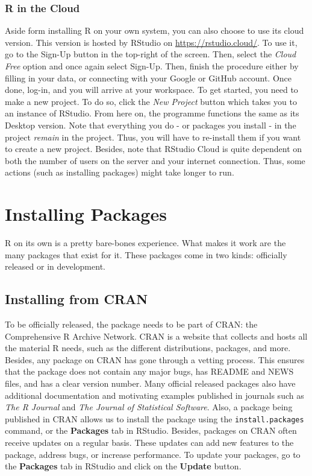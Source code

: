 \documentclass[
]{book}
\begin{document}
\hypertarget{r-in-the-cloud}{%
\subsection{R in the Cloud}\label{r-in-the-cloud}}

Aside form installing R on your own system, you can also choose to use its cloud version. This version is hosted by RStudio on \url{https://rstudio.cloud/}. To use it, go to the Sign-Up button in the top-right of the screen. Then, select the \emph{Cloud Free} option and once again select Sign-Up. Then, finish the procedure either by filling in your data, or connecting with your Google or GitHub account. Once done, log-in, and you will arrive at your workspace. To get started, you need to make a new project. To do so, click the \emph{New Project} button which takes you to an instance of RStudio. From here on, the programme functions the same as its Desktop version. Note that everything you do - or packages you install - in the project \emph{remain} in the project. Thus, you will have to re-install them if you want to create a new project. Besides, note that RStudio Cloud is quite dependent on both the number of users on the server and your internet connection. Thus, some actions (such as installing packages) might take longer to run.

\hypertarget{installing-packages}{%
\chapter{Installing Packages}\label{installing-packages}}

R on its own is a pretty bare-bones experience. What makes it work are the many packages that exist for it. These packages come in two kinds: officially released or in development.

\hypertarget{installing-from-cran}{%
\section{Installing from CRAN}\label{installing-from-cran}}

To be officially released, the package needs to be part of CRAN: the Comprehensive R Archive Network. CRAN is a website that collects and hosts all the material R needs, such as the different distributions, packages, and more. Besides, any package on CRAN has gone through a vetting process. This ensures that the package does not contain any major bugs, has README and NEWS files, and has a clear version number. Many official released packages also have additional documentation and motivating examples published in journals such as \emph{The R Journal} and \emph{The Journal of Statistical Software}. Also, a package being published in CRAN allows us to install the package using the \texttt{install.packages} command, or the \textbf{Packages} tab in RStudio. Besides, packages on CRAN often receive updates on a regular basis. These updates can add new features to the package, address bugs, or increase performance. To update your packages, go to the \textbf{Packages} tab in RStudio and click on the \textbf{Update} button.
\end{document}
